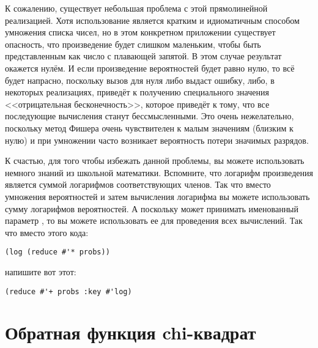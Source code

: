 К сожалению, существует небольшая проблема с этой прямолинейной реализацией.  Хотя
использование  является кратким и идиоматичным способом умножения списка
чисел, но в этом конкретном приложении существует опасность, что произведение будет
слишком маленьким, чтобы быть представленным как число с плавающей запятой. В этом случае
результат окажется нулём.  И если произведение
вероятностей будет равно нулю, то всё будет напрасно, поскольку вызов  для нуля
либо выдаст ошибку, либо, в некоторых реализациях, приведёт к получению специального
значения <<отрицательная бесконечность>>, которое приведёт к тому, что все последующие
вычисления станут бессмысленными.  Это очень нежелательно, поскольку метод Фишера очень
чувствителен к малым значениям (близким к нулю) и при умножении часто возникает
вероятность потери значимых разрядов.

К счастью, для того чтобы избежать данной проблемы, вы можете использовать немного знаний
из школьной математики.  Вспомните, что логарифм произведения является суммой логарифмов
соответствующих членов.  Так что вместо умножения вероятностей и затем вычисления
логарифма вы можете использовать сумму логарифмов вероятностей.  А поскольку
 может принимать именованный параметр , то вы можете использовать
ее для проведения всех вычислений.  Так что вместо этого кода:

\begin{lstlisting}
(log (reduce #'* probs))
\end{lstlisting}

\noindent{}напишите вот этот:

\begin{lstlisting}
(reduce #'+ probs :key #'log)
\end{lstlisting}

\section{Обратная функция chi-квадрат}

